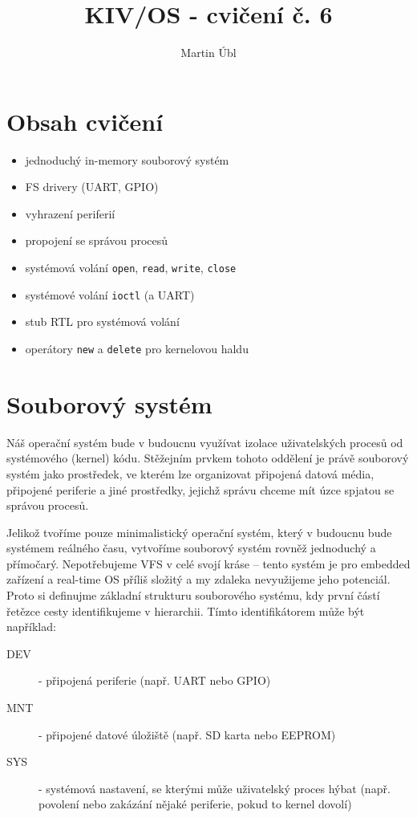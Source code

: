 \documentclass{article}
\author{Martin Úbl}
\title{KIV/OS - cvičení č. 6}
\begin{document}
\maketitle

\section{Obsah cvičení}

\begin{itemize}
	\item jednoduchý in-memory souborový systém
	\item FS drivery (UART, GPIO)
	\item vyhrazení periferií
	\item propojení se správou procesů
	\item systémová volání \texttt{open}, \texttt{read}, \texttt{write}, \texttt{close}
	\item systémové volání \texttt{ioctl} (a UART)
	\item stub RTL pro systémová volání
	\item operátory \texttt{new} a \texttt{delete} pro kernelovou haldu
\end{itemize}

\section{Souborový systém}

Náš operační systém bude v budoucnu využívat izolace uživatelských procesů od systémového (kernel) kódu. Stěžejním prvkem tohoto oddělení je právě souborový systém jako prostředek, ve kterém lze organizovat připojená datová média, připojené periferie a jiné prostředky, jejichž správu chceme mít úzce spjatou se správou procesů.

Jelikož tvoříme pouze minimalistický operační systém, který v budoucnu bude systémem reálného času, vytvoříme souborový systém rovněž jednoduchý a přímočarý. Nepotřebujeme VFS v celé svojí kráse -- tento systém je pro embedded zařízení a real-time OS příliš složitý a my zdaleka nevyužijeme jeho potenciál. Proto si definujme základní strukturu souborového systému, kdy první částí řetězce cesty identifikujeme  v hierarchii. Tímto identifikátorem může být například:
\begin{description}
	\item[DEV] - připojená periferie (např. UART nebo GPIO)
	\item[MNT] - připojené datové úložiště (např. SD karta nebo EEPROM)
	\item[SYS] - systémová nastavení, se kterými může uživatelský proces hýbat (např. povolení nebo zakázání nějaké periferie, pokud to kernel dovolí)
\end{description}
\end{document}
